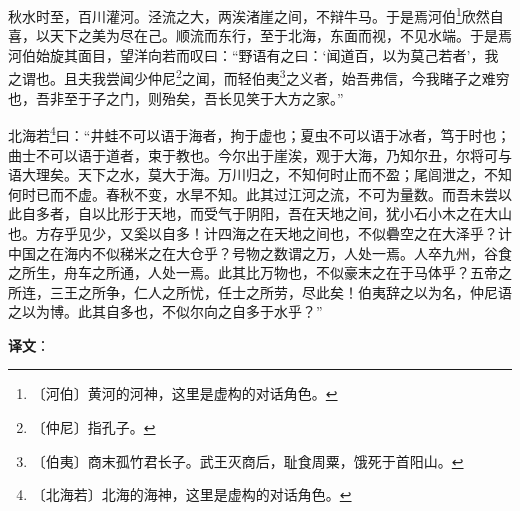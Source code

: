 \documentclass[12pt,UTF-8,openany]{ctexbook}
\begin{document}
\begin{normalsize}
    
    秋水时至，百川灌河。泾流之大，两涘渚崖之间，不辩牛马。于是焉河伯\footnote{〔河伯〕黄河的河神，这里是虚构的对话角色。}欣然自喜，以天下之美为尽在己。顺流而东行，至于北海，东面而视，不见水端。于是焉河伯始旋其面目，望洋向若而叹曰：“野语有之曰：‘闻道百，以为莫己若者’，我之谓也。且夫我尝闻少仲尼\footnote{〔仲尼〕指孔子。}之闻，而轻伯夷\footnote{〔伯夷〕商末孤竹君长子。武王灭商后，耻食周粟，饿死于首阳山。}之义者，始吾弗信，今我睹子之难穷也，吾非至于子之门，则殆矣，吾长见笑于大方之家。”
    
    北海若\footnote{〔北海若〕北海的海神，这里是虚构的对话角色。}曰：“井蛙不可以语于海者，拘于虚也；夏虫不可以语于冰者，笃于时也；曲士不可以语于道者，束于教也。今尔出于崖涘，观于大海，乃知尔丑，尔将可与语大理矣。天下之水，莫大于海。万川归之，不知何时止而不盈；尾闾泄之，不知何时已而不虚。春秋不变，水旱不知。此其过江河之流，不可为量数。而吾未尝以此自多者，自以比形于天地，而受气于阴阳，吾在天地之间，犹小石小木之在大山也。方存乎见少，又奚以自多！计四海之在天地之间也，不似礨空之在大泽乎？计中国之在海内不似稊米之在大仓乎？号物之数谓之万，人处一焉。人卒九州，谷食之所生，舟车之所通，人处一焉。此其比万物也，不似豪末之在于马体乎？五帝之所连，三王之所争，仁人之所忧，任士之所劳，尽此矣！伯夷辞之以为名，仲尼语之以为博。此其自多也，不似尔向之自多于水乎？”
\end{normalsize}


\newpage

\textbf{译文}：

\vspace{1em}
\end{document}
